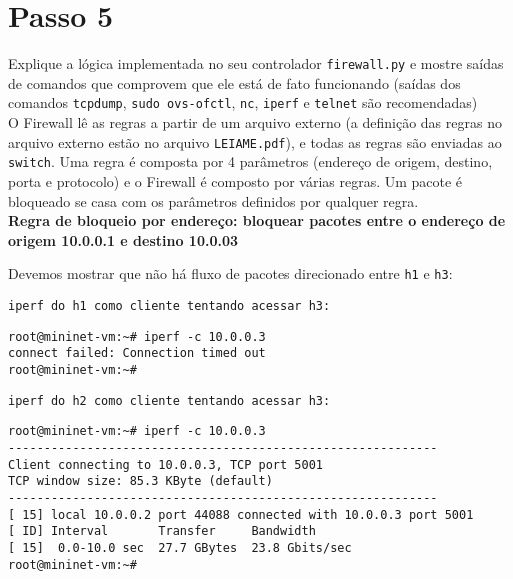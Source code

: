 \documentclass[12pt,letterpaper]{article}
\begin{document}
\section{Passo 5}

Explique a lógica implementada no seu controlador \texttt{firewall.py} e mostre saídas de comandos que comprovem que ele está de fato funcionando (saídas dos comandos \texttt{tcpdump}, \texttt{sudo ovs-ofctl}, \texttt{nc}, \texttt{iperf} e \texttt{telnet} são recomendadas) \\

O Firewall lê as regras a partir de um arquivo externo (a definição das regras no arquivo externo estão no arquivo \texttt{LEIAME.pdf}), e todas as regras são enviadas ao \texttt{switch}. Uma regra é composta por 4 parâmetros (endereço de origem, destino, porta e protocolo) e o Firewall é composto por várias regras. Um pacote é bloqueado se casa com os parâmetros definidos por qualquer regra. \\

\textbf{Regra de bloqueio por endereço: bloquear pacotes entre o endereço de origem 10.0.0.1 e destino 10.0.03}

Devemos mostrar que não há fluxo de pacotes direcionado entre \texttt{h1} e \texttt{h3}:

\begin{verbatim}
iperf do h1 como cliente tentando acessar h3:
\end{verbatim}

\begin{tiny}
\begin{verbatim}
root@mininet-vm:~# iperf -c 10.0.0.3
connect failed: Connection timed out
root@mininet-vm:~# 
\end{verbatim}
\end{tiny}

\begin{verbatim}
iperf do h2 como cliente tentando acessar h3:
\end{verbatim}

\begin{tiny}
\begin{verbatim}
root@mininet-vm:~# iperf -c 10.0.0.3
------------------------------------------------------------
Client connecting to 10.0.0.3, TCP port 5001
TCP window size: 85.3 KByte (default)
------------------------------------------------------------
[ 15] local 10.0.0.2 port 44088 connected with 10.0.0.3 port 5001
[ ID] Interval       Transfer     Bandwidth
[ 15]  0.0-10.0 sec  27.7 GBytes  23.8 Gbits/sec
root@mininet-vm:~# 
\end{verbatim}
\end{tiny}
\end{document}
